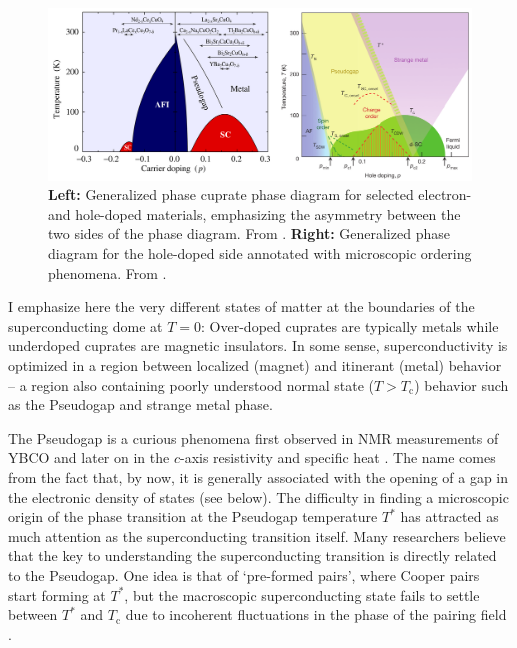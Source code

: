 \begin{figure}
    \centering
    \includegraphics[width=\textwidth]{fig/intro/keimer.png}
    \caption[cuprate phase diagrams]{\textbf{Left:} Generalized phase cuprate phase diagram for selected electron- and hole-doped materials, emphasizing the asymmetry between the two sides of the phase diagram. From \cite{Peets2007}. \textbf{Right:} Generalized phase diagram for the hole-doped side annotated with microscopic ordering phenomena. From \cite{Keimer2015}.}
    \label{fig:cuprate_phase_keimer}
\end{figure}

I emphasize here the very different states of matter at the boundaries of the superconducting dome at $T=0$: Over-doped cuprates are typically metals while underdoped cuprates are magnetic insulators. In some sense, superconductivity is optimized in a region between localized (magnet) and itinerant (metal) behavior -- a region also containing poorly understood normal state ($T > T_\text{c}$) behavior such as the Pseudogap and strange metal phase.

The Pseudogap is a curious phenomena first observed in NMR measurements of YBCO \cite{Alloul1989} and later on in the $c$-axis resistivity \cite{Homes1993} and specific heat \cite{Loram1993}. The name comes from the fact that, by now, it is generally associated with the opening of a gap in the electronic density of states (see below). The difficulty in finding a microscopic origin of the phase transition at the Pseudogap temperature $T^*$ has attracted as much attention as the superconducting transition itself. Many researchers believe that the key to understanding the superconducting transition is directly related to the Pseudogap. One idea is that of `pre-formed pairs', where Cooper pairs start forming at $T^*$, but the macroscopic superconducting state fails to settle between $T^*$ and $T_\text{c}$ due to incoherent fluctuations in the phase of the pairing field \cite{Emery1995, Curty2003}.


